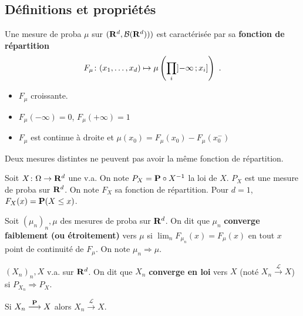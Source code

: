 \subsection{Définitions et propriétés}

	\begin{defn}
		Une mesure de proba $\mu$ sur $(\mathbf{R}^d, \mathcal{B}(\mathbf{R}^d)))$ est caractérisée par sa \textbf{fonction de répartition}
		\vspace{-0.4em}
		$$F_\mu \colon (x_1,\ldots,x_d) \mapsto \mu \left( \prod_i \mathopen{}\mathclose{\left]-\infty\mathclose{}\mathpunct{};x_i\right]} \right)\ .$$
	\end{defn}
	
	\vspace{-0.4em}
	
	\begin{pop}
		\begin{itemize}
			\item[\textbullet] $F_\mu$ croissante.
			\item[\textbullet] $F_\mu(-\infty) = 0$, $F_\mu(+\infty) = 1$
			\item[\textbullet] $F_\mu$ est continue à droite et $\mu({x_0}) = F_\mu(x_0) - F_\mu(x_0^-)$
		\end{itemize}
	\end{pop}
	
	\begin{thm}
		Deux mesures distintes ne peuvent pas avoir la même fonction de répartition.
	\end{thm}
	
	Soit $X \colon \Omega \to \mathbf{R}^d$ une v.a.
	On note $P_X = \mathbf{P} \circ X^{-1}$ la loi de $X$.
	$P_X$ est une mesure de proba sur $\mathbf{R}^d$.
	On note $F_X$ sa fonction de répartition.
	Pour $d = 1$, $F_X(x) = \mathbf{P}(X \leq x)$.
	
	\begin{defn}
		Soit $(\mu_n)_n, \mu$ des mesures de proba sur $\mathbf{R}^d$.
		On dit que $\mu_n$ \textbf{converge faiblement (ou étroitement)} vers $\mu$ si $\lim_n F_{\mu_n}(x) = F_\mu(x)$ en tout $x$ point de continuité de $F_\mu$.
		On note $\mu_n \Rightarrow \mu$.
	\end{defn}

	\begin{defn}
		$(X_n)_n, X$ v.a. sur $\mathbf{R}^d$.
		On dit que $X_n$ \textbf{converge en loi} vers $X$ (noté $X_n \overset{\mathcal{L}}{\longrightarrow} X$) si $P_{X_n} \Rightarrow P_X$.
	\end{defn}

	\begin{pop}
		Si $X_n \overset{\mathbf{P}}{\longrightarrow} X$ alors $X_n \overset{\mathcal{L}}{\longrightarrow} X$.
	\end{pop}

